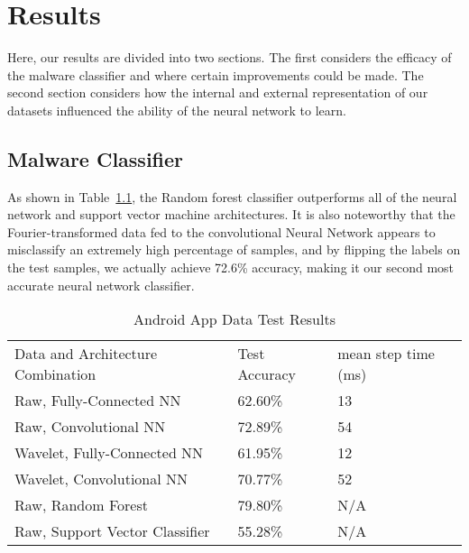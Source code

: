 \chapter{Results}
\label{chap:three}

Here, our results are divided into two sections. 
The first considers the efficacy of the malware classifier and where certain improvements could be made.
The second section considers how the internal and external representation of our datasets influenced the ability of the neural network to learn.

\section{Malware Classifier} \label{malware classifier}
As shown in Table~\ref{Tab:test}, the Random forest classifier outperforms all of the neural network and support vector machine architectures.
It is also noteworthy that the Fourier-transformed data fed to the convolutional Neural Network appears to misclassify an extremely high percentage of samples, and by flipping the labels on the test samples, we actually achieve 72.6\% accuracy, making it our second most accurate neural network classifier.

 
\begin{table}[ht]
\caption{Android App Data Test Results}
\centering
\label{Tab:test}	
\begin{tabular}{lll}
Data and Architecture Combination & Test Accuracy & mean step time (ms) \\
Raw, Fully-Connected NN           & 62.60\%         & 13                  \\
Raw, Convolutional NN             & 72.89\%         & 54                  \\
Wavelet, Fully-Connected NN       & 61.95\%         & 12                  \\
Wavelet, Convolutional NN         & 70.77\%         & 52                  \\
Raw, Random Forest                & 79.80\%         & N/A                 \\
Raw, Support Vector Classifier    & 55.28\%         & N/A                
\end{tabular}
\end{table}
 
